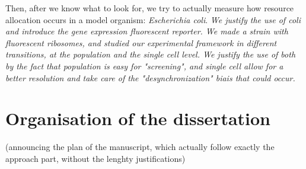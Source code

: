 Then, after we know what to look for, we try to actually measure how resource allocation occurs in a model organism: \textit{Escherichia coli}.
\textit{We justify the use of coli and introduce the gene expression fluorescent reporter.
We made a strain with fluorescent ribosomes, and studied our experimental framework in different transitions, at the population and the single cell level.
We justify the use of both by the fact that population is easy for "screening", and single cell allow for a better resolution and take care of the "desynchronization" biais that could occur.}

\section{Organisation of the dissertation}

(announcing the plan of the manuscript, which actually follow exactly the approach part, without the lenghty justifications)
